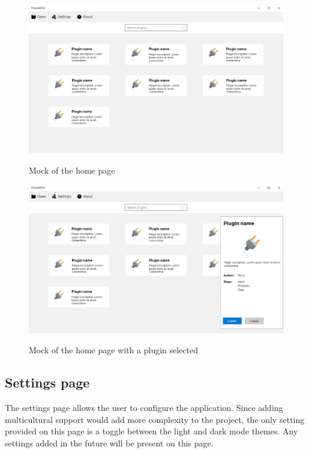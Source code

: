 \begin{figure}[H]
    \includegraphics[width=\linewidth]{img/mockHome.png}
    \label{fig:homePage}
    \caption{Mock of the home page}
\end{figure}

\begin{figure}[H]
    \includegraphics[width=\linewidth]{img/mockHome-PluginSelected.png}
    \label{fig:homePagePluginSelected}
    \caption{Mock of the home page with a plugin selected}
\end{figure}

\pagebreak
\subsection{Settings page}

The settings page allows the user to configure the application. Since adding multicultural support would add more complexity to the project, the only setting provided on this page is a toggle between the light and dark mode themes. Any settings added in the future will be present on this page.

